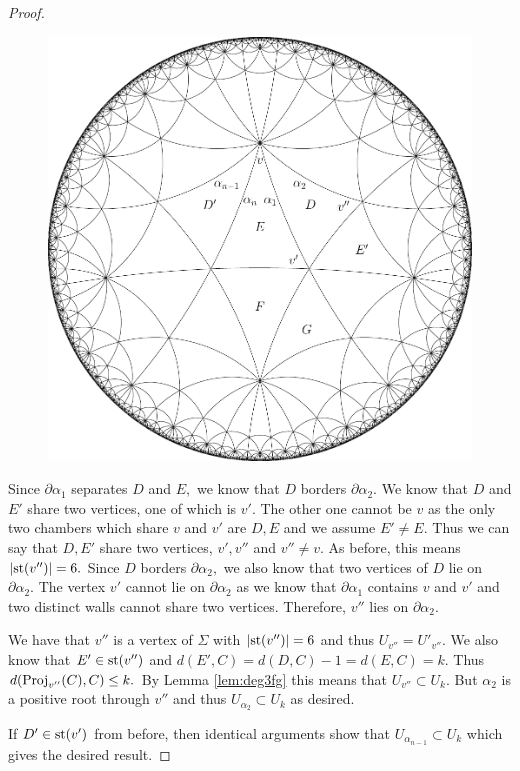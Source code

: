 \documentclass[class=book, crop=false]{standalone}
\begin{document}
\begin{proof}
\begin{figure}[h]
	\label{fig:33n}
	\begin{center}
		\includegraphics[width=4.5 in]{diagrams/deg33n.pdf}
\end{center}
\end{figure}


	Since $\partial\alpha_1$ separates $D$ and $E,$ we know that $D$ borders $\partial \alpha_2.$ We know that $D$ and $E'$ share two vertices, one of which is $v'.$ The other one cannot be $v$ as the only two chambers which share $v$ and $v'$ are $D,E$ and we assume $E'\neq E.$ Thus we can say that $D,E'$ share two vertices, $v',v''$ and $v''\neq v.$ As before, this means $|\mathrm{st}(v'')|=6.$ Since $D$ borders $\partial \alpha_2,$ we also know that two vertices of $D$ lie on $\partial \alpha_2.$ The vertex $v'$ cannot lie on $\partial\alpha_2$ as we know that $\partial\alpha_1$ contains $v$ and $v'$ and two distinct walls cannot share two vertices. Therefore, $v''$ lies on $\partial \alpha_2.$ 

	We have that $v''$ is a vertex of $\Sigma$ with $|\mathrm{st}(v'')|=6$ and thus $U_{v''}=U'_{v''}.$ We also know that $E'\in \mathrm{st}(v'')$ and $d(E',C)=d(D,C)-1=d(E,C)=k.$ Thus $d(\mathrm{Proj}_{v''}(C),C)\le k.$ By Lemma \ref{lem:deg3fg} this means that $U_{v''}\subset U_k.$ But $\alpha_2$ is a positive root through $v''$ and thus $U_{\alpha_2}\subset U_k$ as desired.

	If $D'\in \mathrm{st}(v')$ from before, then identical arguments show that $U_{\alpha_{n-1}}\subset U_k$ which gives the desired result.
\end{proof}
\end{document}
